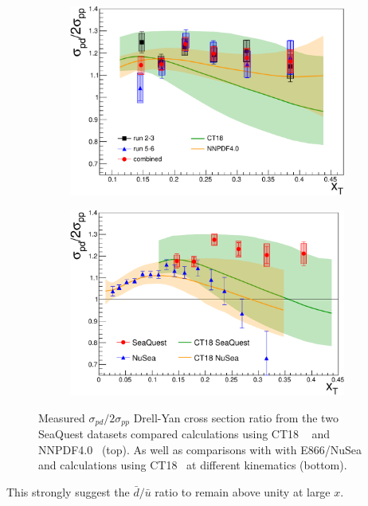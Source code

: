 \documentclass[reprint,aps,unsortedaddress,superscriptaddress,prc,floatfix,showpacs,linenumbers,final]{revtex4-2}
\begin{document}
\begin{figure}[htbp!]
	\captionsetup[subfigure]{labelformat=empty}
	\begin{subfigure}{\linewidth}
		\centering
		\includegraphics[width=\linewidth]{data_full_xT_syst.pdf}	
		\label{subfig:xT_csr_data}
	\end{subfigure}
	\begin{subfigure}{\linewidth}
		\centering
		\includegraphics[width=\linewidth]{E906_E866_xT_CT18only.pdf}
		\label{subfig:xT_csr_exp}
	\end{subfigure}
	\caption{Measured $\sigma_{pd}/2\sigma_{pp}$ Drell-Yan cross section ratio from the two SeaQuest datasets compared calculations using 
		CT18 ~\cite{hou2021} and NNPDF4.0~\cite{ball2022a} (top). As well as comparisons with
		with E866/NuSea~\cite{towell2001} and calculations using CT18~\cite{hou2021} at different kinematics (bottom).}
	\label{fig:xT_csr}
\end{figure}
This strongly suggest the $\bar{d}/\bar{u}$ ratio to remain above unity at large $x$.
\end{document}
